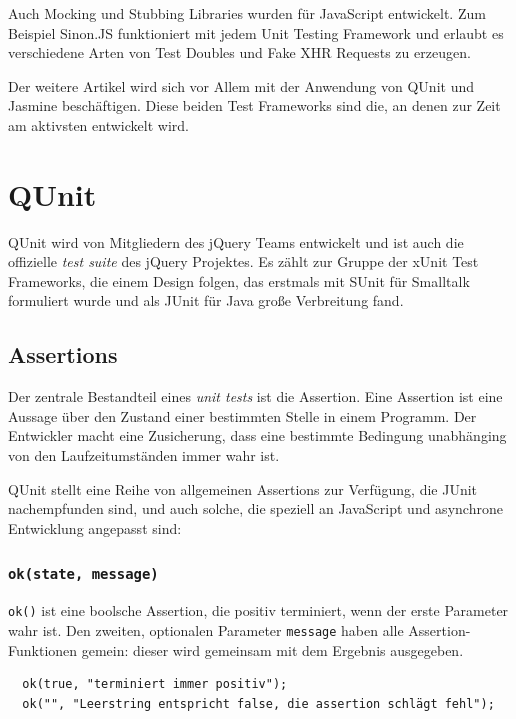 \documentclass[11pt, a4paper]{article}
\begin{document}
Auch Mocking und Stubbing Libraries wurden für JavaScript entwickelt.
Zum Beispiel Sinon.JS\cite{johansen_sinon.js_2011} funktioniert mit jedem Unit
Testing Framework und erlaubt es verschiedene Arten von Test Doubles und Fake
XHR Requests zu erzeugen.

Der weitere Artikel wird sich vor Allem mit der Anwendung von QUnit und Jasmine
beschäftigen. Diese beiden Test Frameworks sind die, an denen zur Zeit am
aktivsten entwickelt wird.

\section{QUnit}

QUnit\cite{zaefferer_qunit_2011} wird von Mitgliedern des jQuery
Teams\cite{resig_jquery_2011} entwickelt und ist auch die offizielle
\emph{test suite} des jQuery Projektes. Es zählt zur Gruppe der
xUnit Test Frameworks\cite{fowler_xunit_2010}, die einem Design folgen,
das erstmals mit SUnit\cite{beck_simple_1994} für Smalltalk formuliert
wurde und als JUnit\cite{gamma_junit_2011} für Java große Verbreitung fand.

\subsection{Assertions}

Der zentrale Bestandteil eines \emph{unit tests} ist die Assertion. Eine
Assertion ist eine Aussage über den Zustand einer bestimmten Stelle in
einem Programm\cite{wikipedia_assertion_2011}. Der Entwickler macht eine
Zusicherung, dass eine bestimmte Bedingung unabhänging von den Laufzeitumständen
immer wahr ist.

QUnit stellt eine Reihe von allgemeinen Assertions zur Verfügung,
die JUnit nachempfunden sind, und auch solche, die speziell an JavaScript
und asynchrone Entwicklung angepasst sind\cite{zaefferer_qunit_2011}:

\subsubsection*{\texttt{ok(state, message)}}

\texttt{ok()} ist eine boolsche Assertion, die positiv terminiert, wenn der
erste Parameter wahr ist. Den zweiten, optionalen Parameter \texttt{message} haben alle
Assertion-Funktionen gemein: dieser wird gemeinsam mit dem Ergebnis
ausgegeben.

\begin{verbatim}
  ok(true, "terminiert immer positiv");
  ok("", "Leerstring entspricht false, die assertion schlägt fehl");
\end{verbatim}
\end{document}
